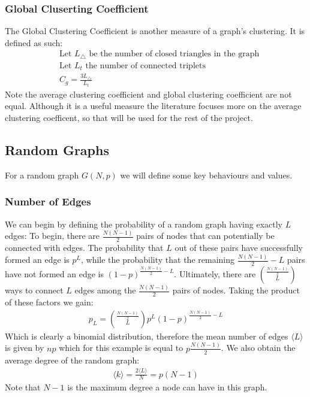 \documentclass{article}
\begin{document}
        \subsubsection{Global Cluserting Coefficient}
        The Global Clustering Coefficient is another measure of a graph's clustering. It is defined as such:
        \begin{align*}
            &\text{Let $L_\triangle$ be the number of closed triangles in the graph}\\
            &\text{Let $L_t$ the number of connected triplets}\\
            &C_g = \frac{3L_\triangle}{L_t}
        \end{align*}
        Note the average clustering coefficient and global clustering coefficient are not equal. Although it is a useful measure the literature focuses more on the average clustering coefficent, so that will be used for the rest of the project.

        \subsection{Random Graphs}
        For a random graph $G(N,p)$ we will define some key behaviours and values.
            \subsubsection{Number of Edges}
            We can begin by defining the probability of a random graph having exactly $L$ edges:
            To begin, there are $\frac{N(N-1)}{2}$ pairs of nodes that can potentially be connected with edges. The probability that $L$ out of these pairs have successfully formed an edge is $p^L$, while the probability that the remaining $\frac{N(N-1)}{2} - L$ pairs have not formed an edge is $(1-p)^{\frac{N(N-1)}{2} - L}$. Ultimately, there are $\binom{\frac{N(N-1)}{2}}{L}$ ways to connect $L$ edges among the $\frac{N(N-1)}{2}$ pairs of nodes. Taking the product of these factors we gain:
            \begin{align*}
                p_{L} = \binom{\frac{N(N-1)}{2}}{L}p^L(1-p)^{\frac{N(N-1)}{2} -L}
            \end{align*}
            Which is clearly a binomial distribution, therefore the mean number of edges $\langle L \rangle$ is given by $np$ which for this example is equal to $p\frac{N(N-1)}{2}$. We also obtain the average degree of the random graph:
            \begin{align*}
                \langle k \rangle = \frac{2 \langle L \rangle}{N} = p(N-1)
            \end{align*}
            Note that $N-1$ is the maximum degree a node can have in this graph.
\end{document}
